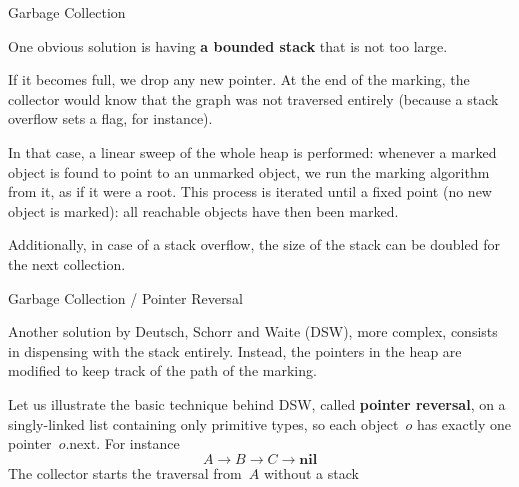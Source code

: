 \documentclass[compress,dvipdfmx]{beamer}
\begin{document}
%
\begin{frame}{Garbage Collection}

  One obvious solution is having \textbf{a bounded stack} that is not
  too large.

  \bigskip

  If it becomes full, we drop any new pointer. At the end of the
  marking, the collector would know that the graph was not traversed
  entirely (because a stack overflow sets a flag, for instance).

  \bigskip

  In that case, a linear sweep of the whole heap is performed:
  whenever a marked object is found to point to an unmarked object, we
  run the marking algorithm from it, as if it were a root. This
  process is iterated until a fixed point (no new object is marked):
  all reachable objects have then been marked.

  \bigskip

  Additionally, in case of a stack overflow, the size of the stack can
  be doubled for the next collection.

\end{frame}

%
\begin{frame}{Garbage Collection / Pointer Reversal}

  Another solution by Deutsch, Schorr and Waite (DSW), more complex,
  consists in dispensing with the stack entirely. Instead, the
  pointers in the heap are modified to keep track of the path of the
  marking.

  \bigskip

  Let us illustrate the basic technique behind DSW, called
  \textbf{pointer reversal}, on a singly\hyp{}linked list containing
  only primitive types, so each object~\(o\) has exactly one
  pointer~\(o\).next. For instance
  \[
  A \longrightarrow B \longrightarrow C \longrightarrow \textbf{nil}
  \]
  The collector starts the traversal from~\(A\) without a stack

\end{frame}
\end{document}
